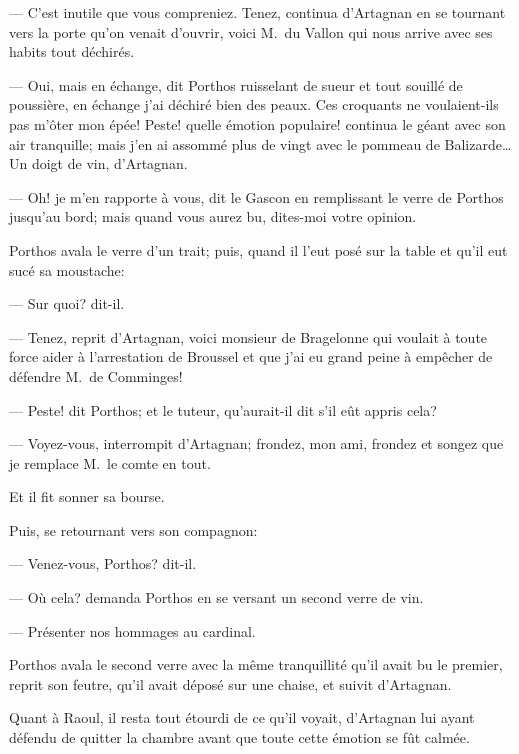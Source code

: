 — C'est inutile que vous compreniez. Tenez, continua d'Artagnan en se tournant vers la porte qu'on venait d'ouvrir, voici M.~du Vallon qui nous arrive avec ses habits tout déchirés.

— Oui, mais en échange, dit Porthos ruisselant de sueur et tout souillé de poussière, en échange j'ai déchiré bien des peaux. Ces croquants ne voulaient-ils pas m'ôter mon épée! Peste! quelle émotion populaire! continua le géant avec son air tranquille; mais j'en ai assommé plus de vingt avec le pommeau de Balizarde\dots Un doigt de vin, d'Artagnan.

— Oh! je m'en rapporte à vous, dit le Gascon en remplissant le verre de Porthos jusqu'au bord; mais quand vous aurez bu, dites-moi votre opinion.

Porthos avala le verre d'un trait; puis, quand il l'eut posé sur la table et qu'il eut sucé sa moustache:

— Sur quoi? dit-il.

— Tenez, reprit d'Artagnan, voici monsieur de Bragelonne qui voulait à toute force aider à l'arrestation de Broussel et que j'ai eu grand peine à empêcher de défendre M.~de Comminges!

— Peste! dit Porthos; et le tuteur, qu'aurait-il dit s'il eût appris cela?

— Voyez-vous, interrompit d'Artagnan; frondez, mon ami, frondez et songez que je remplace M.~le comte en tout.

Et il fit sonner sa bourse.

Puis, se retournant vers son compagnon:

— Venez-vous, Porthos? dit-il.

— Où cela? demanda Porthos en se versant un second verre de vin.

— Présenter nos hommages au cardinal.

Porthos avala le second verre avec la même tranquillité qu'il avait bu le premier, reprit son feutre, qu'il avait déposé sur une chaise, et suivit d'Artagnan.

Quant à Raoul, il resta tout étourdi de ce qu'il voyait, d'Artagnan lui ayant défendu de quitter la chambre avant que toute cette émotion se fût calmée.